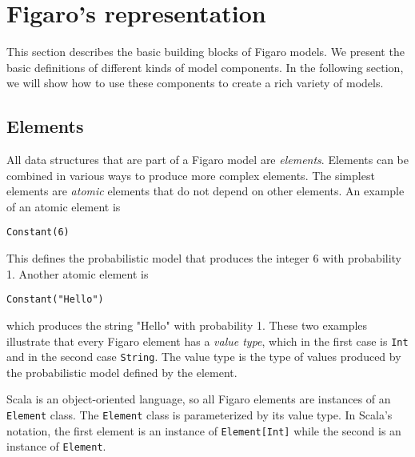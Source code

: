 
\chapter{Figaro's representation} %

\label{Figaro's representation} %

This section describes the basic building blocks of Figaro models. We present the basic definitions of different kinds of model components. In the following section, we will show how to use these components to create a rich variety of models.

\section{Elements}
All data structures that are part of a Figaro model are \emph{elements}. Elements can be combined in various ways to produce more complex elements. The simplest elements are \emph{atomic} elements that do not depend on other elements. An example of an atomic element is

\begin{flushleft}
\texttt{Constant(6)}
\end{flushleft}

This defines the probabilistic model that produces the integer 6 with probability
1. Another atomic element is
\begin{flushleft}
\texttt{Constant("Hello")}
\end{flushleft}

which produces the string "Hello" with probability 1. These two examples illustrate that every Figaro element has a \emph{value type}, which in the first case is \texttt{Int} and in the second case \texttt{String}. The value type is the type of values produced by the probabilistic model defined by the element.


Scala is an object-oriented language, so all Figaro elements are instances of an \texttt{Element} class. The \texttt{Element} class is parameterized by its value type. In Scala's notation, the first element is an instance of \texttt{Element[Int]} while the second is an instance of \texttt{Element\-[String]}.

